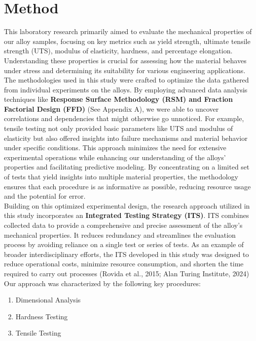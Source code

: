 \documentclass{article}
\begin{document}
\section{Method}
This laboratory research primarily aimed to evaluate the mechanical properties of our alloy samples, focusing on key metrics such as yield strength, ultimate tensile strength (UTS), modulus of elasticity, hardness, and percentage elongation. Understanding these properties is crucial for assessing how the material behaves under stress and determining its suitability for various engineering applications.\\[8pt]
The methodologies used in this study were crafted to optimize the data gathered from individual experiments on the alloys. By employing advanced data analysis techniques like \textbf{Response Surface Methodology (RSM) and Fraction Factorial Design (FFD)} (See Appendix A), we were able to uncover correlations and dependencies that might otherwise go unnoticed. For example, tensile testing not only provided basic parameters like UTS and modulus of elasticity but also offered insights into failure mechanisms and material behavior under specific conditions. This approach minimizes the need for extensive experimental operations while enhancing our understanding of the alloys' properties and facilitating predictive modeling. By concentrating on a limited set of tests that yield insights into multiple material properties, the methodology ensures that each procedure is as informative as possible, reducing resource usage and the potential for error.\\[8pt]
Building on this optimized experimental design, the research approach utilized in this study incorporates an \textbf{Integrated Testing Strategy (ITS)}. ITS combines collected data to provide a comprehensive and precise assessment of the alloy's mechanical properties. It reduces redundancy and streamlines the evaluation process by avoiding reliance on a single test or series of tests. As an example of broader interdisciplinary efforts, the ITS developed in this study was designed to reduce operational costs, minimize resource consumption, and shorten the time required to carry out processes (Rovida et al., 2015; Alan Turing Institute, 2024)\\[8pt]
Our approach was characterized by the following key procedures:
\begin{enumerate}[itemsep=-0.5mm]
    \item Dimensional Analysis
    \item Hardness Testing
    \item Tensile Testing 
\end{enumerate}
\end{document}
